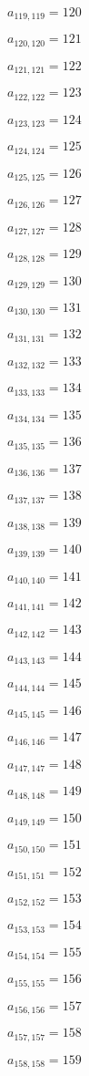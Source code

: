 \documentclass[a4paper,12pt]{article}
\begin{document}
$a _{ 119, 119 } = 120$

$a _{ 120, 120 } = 121$

$a _{ 121, 121 } = 122$

$a _{ 122, 122 } = 123$

$a _{ 123, 123 } = 124$

$a _{ 124, 124 } = 125$

$a _{ 125, 125 } = 126$

$a _{ 126, 126 } = 127$

$a _{ 127, 127 } = 128$

$a _{ 128, 128 } = 129$

$a _{ 129, 129 } = 130$

$a _{ 130, 130 } = 131$

$a _{ 131, 131 } = 132$

$a _{ 132, 132 } = 133$

$a _{ 133, 133 } = 134$

$a _{ 134, 134 } = 135$

$a _{ 135, 135 } = 136$

$a _{ 136, 136 } = 137$

$a _{ 137, 137 } = 138$

$a _{ 138, 138 } = 139$

$a _{ 139, 139 } = 140$

$a _{ 140, 140 } = 141$

$a _{ 141, 141 } = 142$

$a _{ 142, 142 } = 143$

$a _{ 143, 143 } = 144$

$a _{ 144, 144 } = 145$

$a _{ 145, 145 } = 146$

$a _{ 146, 146 } = 147$

$a _{ 147, 147 } = 148$

$a _{ 148, 148 } = 149$

$a _{ 149, 149 } = 150$

$a _{ 150, 150 } = 151$

$a _{ 151, 151 } = 152$

$a _{ 152, 152 } = 153$

$a _{ 153, 153 } = 154$

$a _{ 154, 154 } = 155$

$a _{ 155, 155 } = 156$

$a _{ 156, 156 } = 157$

$a _{ 157, 157 } = 158$

$a _{ 158, 158 } = 159$
\end{document}
